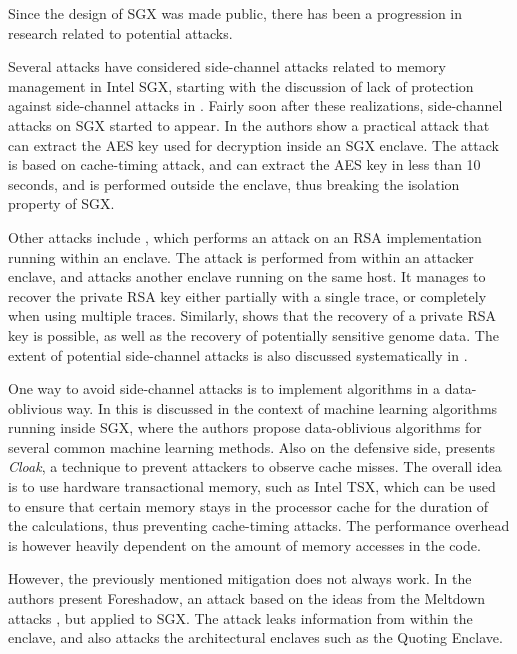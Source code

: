 Since the design of SGX was made public, there has been a progression in research related to potential attacks.

Several attacks have considered side-channel attacks related to memory management in Intel SGX, starting with the discussion of lack of protection against side-channel attacks in \cite{costan:2016}.
Fairly soon after these realizations, side-channel attacks on SGX started to appear.
In \cite{gotzfried:2017} the authors show a practical attack that can extract the AES key used for decryption inside an SGX enclave.
The attack is based on cache-timing attack, and can extract the AES key in less than 10 seconds, and is performed outside the enclave, thus breaking the isolation property of SGX.

Other attacks include \cite{schwarz:2017}, which performs an attack on an RSA implementation running within an enclave.
The attack is performed from within an attacker enclave, and attacks another enclave running on the same host.
It manages to recover the private RSA key either partially with a single trace, or completely when using multiple traces.
Similarly, \cite{brasser:2017} shows that the recovery of a private RSA key is possible, as well as the recovery of potentially sensitive genome data.
The extent of potential side-channel attacks is also discussed systematically in \cite{wang:2017}.

One way to avoid side-channel attacks is to implement algorithms in a data-oblivious way.
In \cite{ohrimenko:2016} this is discussed in the context of machine learning algorithms running inside SGX, where the authors propose data-oblivious algorithms for several common machine learning methods.
Also on the defensive side, \cite{gruss:2017} presents \emph{Cloak}, a technique to prevent attackers to observe cache misses.
The overall idea is to use hardware transactional memory, such as Intel TSX, which can be used to ensure that certain memory stays in the processor cache for the duration of the calculations, thus preventing cache-timing attacks.
The performance overhead is however heavily dependent on the amount of memory accesses in the code.

However, the previously mentioned mitigation does not always work.
In \cite{vanbulck:2018} the authors present Foreshadow, an attack based on the ideas from the Meltdown attacks \cite{lipp:2018}, but applied to SGX.
The attack leaks information from within the enclave, and also attacks the architectural enclaves such as the Quoting Enclave.

